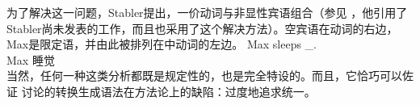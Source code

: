 
\eal
{}
\zl
为了解决这一问题，Stabler提出，一价动词与非显性宾语组合（参见 \citet[, 124]{Veenstra98a}，他引用了Stabler尚未发表的工作，而且也采用了这个解决方法）。空宾语在动词的右边，Max是限定语，并由此被排列在中动词的左边。
\ea
\label{Beispiel-leeres-Element-intransitive-Verben}
\gll Max sleeps \_.\\
     Max 睡觉 \\
\z
当然，任何一种这类分析都既是规定性的，也是完全特设的。而且，它恰巧可以佐证 \citet[2.1.2]{CJ2005a}讨论的转换生成语法在方法论上的缺陷：过度地追求统一。

